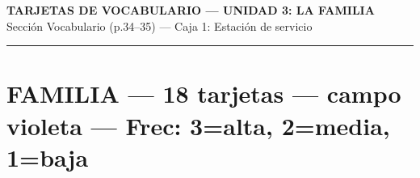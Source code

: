 \documentclass[a4paper,landscape,8pt]{article}
\begin{document}
\begin{center}
{\Large\textbf{TARJETAS DE VOCABULARIO — UNIDAD 3: LA FAMILIA}}\\[0.2cm]
{\normalsize Sección Vocabulario (p.34--35) — Caja 1: Estación de servicio}
\end{center}

\vspace{0.3cm}


\noindent\textcolor{violeta}{\rule{\linewidth}{2pt}}
\section*{\textcolor{violeta}{FAMILIA} {\small — 18 tarjetas — campo violeta — Frec: 3=alta, 2=media, 1=baja}}
\end{document}
